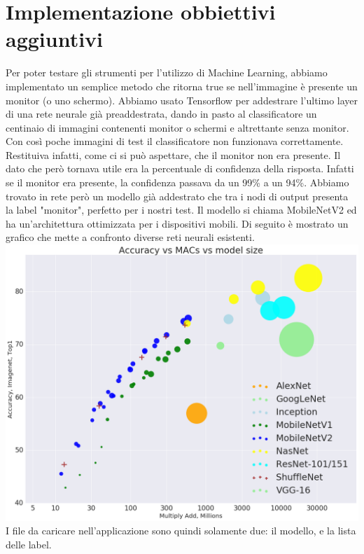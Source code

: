 \documentclass[twoside]{supsistudent}
\newcommand{\Decaa}{\newline\vspace{0.5mm}\newline\noindent}
\begin{document}
\newpage
\section{Implementazione obbiettivi aggiuntivi}%
Per poter testare gli strumenti per l'utilizzo di Machine Learning, abbiamo implementato un semplice metodo che ritorna true se nell'immagine è presente un monitor (o uno schermo). Abbiamo usato Tensorflow per addestrare l'ultimo layer di una rete neurale già preaddestrata, dando in pasto al classificatore un centinaio di immagini contenenti monitor o schermi e altrettante senza monitor. Con così poche immagini di test il classificatore non funzionava correttamente. Restituiva infatti, come ci si può aspettare, che il monitor non era presente. Il dato che però tornava utile era la percentuale di confidenza della risposta. Infatti se il monitor era presente, la confidenza passava da un 99\% a un 94\%. 
Abbiamo trovato in rete però un modello già addestrato che tra i nodi di output presenta la label "monitor", perfetto per i nostri test. Il modello si chiama MobileNetV2 ed ha un'architettura ottimizzata per i dispositivi mobili. Di seguito è mostrato un grafico che mette a confronto diverse reti neurali esistenti.
\Decaa
\includegraphics[width=\textwidth]{Pictures/accuracy.PNG}
\Decaa
I file da caricare nell'applicazione sono quindi solamente due: il modello, e la lista delle label. 
\end{document}
